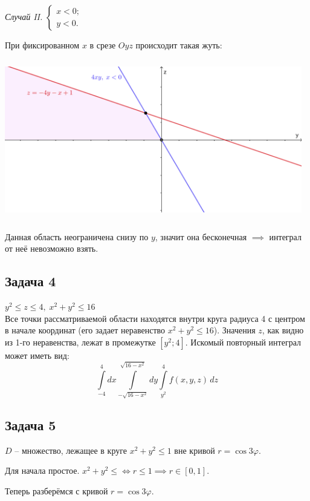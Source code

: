 \documentclass[a4paper, fleqn]{article}
\begin{document}
   \textit{Случай II.} $\begin{cases}
   x < 0;\\
   y < 0.
   \end{cases}$
   
   При фиксированном $x$ в срезе $Oyz$ происходит такая жуть:
   
   \includegraphics[width=13cm, height=7cm]{list24imgs/task 2.4.5-2.png}
    
    Данная область неограничена снизу по $y$, значит она бесконечная $\implies$ интеграл от неё невозможно взять.
    
    \subsection*{Задача 4}
    
    $y^2 \le z \le 4, \; x^2 + y^2 \le 16$\\
    
    Все точки рассматриваемой области находятся внутри круга радиуса 4 с центром в начале координат (его задает неравенство $x^2 + y^2 \le 16$). Значения $z$, как видно из 1-го неравенства, лежат в промежутке $[y^2; 4]$. Искомый повторный интеграл может иметь вид:
    \[ \int\limits_{-4}^{4} dx \int\limits_{-\sqrt{16-x^2}}^{\sqrt{16-x^2}} dy \int\limits_{y^2}^{4} f(x, y, z)\, dz  \]
    
        
    \subsection*{Задача 5}
    
    $D$ -- множество, лежащее в круге $x^2 + y^2 \leq 1$ вне кривой $r = \cos 3 \varphi.$
    
    
    Для начала простое. $x^2 + y^2 \leq \iff r \leq 1 \implies r \in [0,1].$
    
    Теперь разберёмся с кривой $r  = \cos 3 \varphi$.
    
\end{document}
